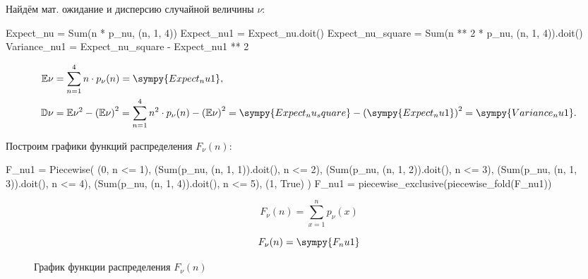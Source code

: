 Найдём мат. ожидание и дисперсию случайной величины $\nu$:

\begin{sympycode}
Expect_nu = Sum(n * p_nu, (n, 1, 4))
Expect_nu1 = Expect_nu.doit()
Expect_nu_square = Sum(n ** 2 * p_nu, (n, 1, 4)).doit()
Variance_nu1 = Expect_nu_square - Expect_nu1 ** 2
\end{sympycode}
\[
    \begin{aligned}
        \Expect\nu
         & = \sum\limits_{n=1}^{4} n \cdot p_\nu (n)
        = \sympy{Expect_nu1},                         \\
        \Variance\nu
         & = \Expect\nu^2 - \left(\Expect\nu\right)^2
        = \sum\limits_{n=1}^{4} n^2 \cdot p_\nu (n) - \left(\Expect\nu\right)^2
        = \sympy{Expect_nu_square} - \left(\sympy{Expect_nu1}\right)^2
        = \sympy{Variance_nu1}.
    \end{aligned}
\]

Построим графики функций распределения $F_\nu(n)$:

\begin{sympycode}
F_nu1 = Piecewise(
    (0, n <= 1),
    (Sum(p_nu, (n, 1, 1)).doit(), n <= 2),
    (Sum(p_nu, (n, 1, 2)).doit(), n <= 3),
    (Sum(p_nu, (n, 1, 3)).doit(), n <= 4),
    (Sum(p_nu, (n, 1, 4)).doit(), n <= 5),
    (1, True)
)
F_nu1 = piecewise_exclusive(piecewise_fold(F_nu1))
\end{sympycode}

\[
    F_\nu (n) = \sum\limits_{x=1}^{n} p_\nu (x)
\]

\[
    F_\nu (n) = \sympy{F_nu1}
\]

\begin{figure}
    \centering
    \caption{График функции распределения $F_\nu(n)$}
    \label{fig:F_nu}
\end{figure}